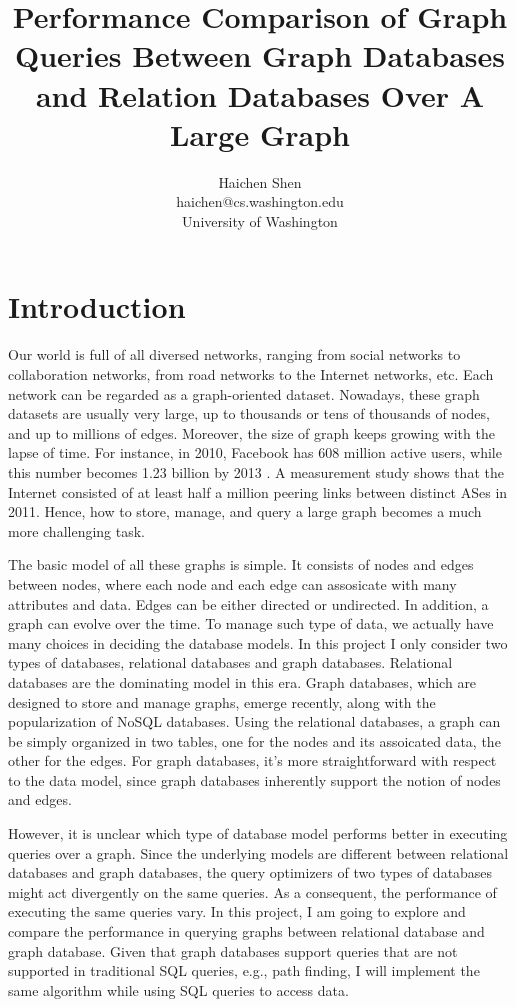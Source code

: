 \documentclass[letterpaper,twocolumn,10pt]{article}
\author{\rm Haichen Shen\\ 
       haichen@cs.washington.edu \\
       University of Washington \\
       }
\date{}
\begin{document}
\title{Performance Comparison of Graph Queries Between Graph Databases and Relation Databases Over A Large Graph}
\maketitle

\section{Introduction}
Our world is full of all diversed networks, ranging from social networks to collaboration networks, from road networks to the Internet networks, etc. Each network can be regarded as a graph-oriented dataset. Nowadays, these graph datasets are usually very large, up to thousands or tens of thousands of nodes, and up to millions of edges. Moreover, the size of graph keeps growing with the lapse of time. For instance, in 2010, Facebook has 608 million active users, while this number becomes 1.23 billion by 2013 \cite{fb_users}. A measurement study \cite{ager2012anatomy} shows that the Internet consisted of at least half a million peering links between distinct ASes in 2011. Hence, how to store, manage, and query a large graph becomes a much more challenging task.

The basic model of all these graphs is simple. It consists of nodes and edges between nodes, where each node and each edge can assosicate with many attributes and data. Edges can be either directed or undirected. In addition, a graph can evolve over the time. To manage such type of data, we actually have many choices in deciding the database models. In this project I only consider two types of databases, relational databases and graph databases. Relational databases are the dominating model in this era. Graph databases, which are designed to store and manage graphs, emerge recently, along with the popularization of NoSQL databases. Using the relational databases, a graph can be simply organized in two tables, one for the nodes and its assoicated data, the other for the edges. For graph databases, it's more straightforward with respect to the data model, since graph databases inherently support the notion of nodes and edges. 

However, it is unclear which type of database model performs better in executing queries over a graph. Since the underlying models are different between relational databases and graph databases, the query optimizers of two types of databases might act divergently on the same queries. As a consequent, the performance of executing the same queries vary. In this project, I am going to explore and compare the performance in querying graphs between relational database and graph database. Given that graph databases support queries that are not supported in traditional SQL queries, e.g., path finding, I will implement the same algorithm while using SQL queries to access data.
\end{document}
